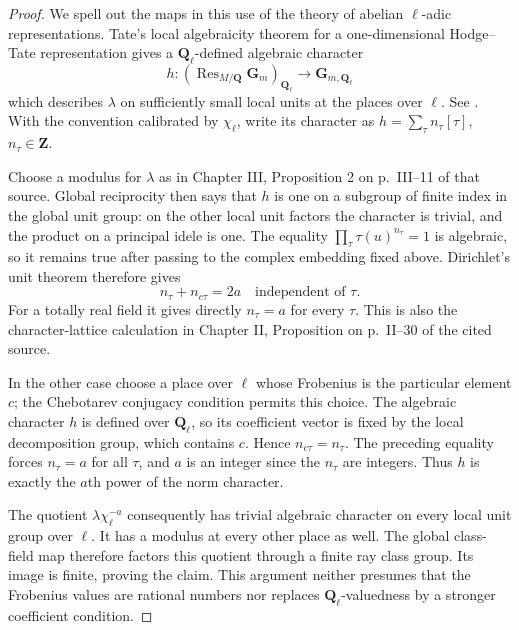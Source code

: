 \begin{proof}
We spell out the maps in this use of the theory of
abelian $\ell$-adic representations. Tate's local
algebraicity theorem for a one-dimensional Hodge--Tate
representation gives a $\mathbf Q_\ell$-defined
algebraic character
\[
 h:(\operatorname{Res}_{M/\mathbf Q}\mathbf G_m)_{\mathbf Q_\ell}
                              \longrightarrow\mathbf G_{m,\mathbf Q_\ell}
\]
which describes $\lambda$ on sufficiently small
local units at the places over $\ell$. See
\cite[Chapter III, Theorem on p.~III--7 and Proposition
on p.~III--9]{A_SerreAbelian}. With the convention
calibrated by $\chi_\ell$, write its character as
$h=\sum_\tau n_\tau[\tau]$, $n_\tau\in\mathbf Z$.

Choose a modulus for $\lambda$ as in Chapter III,
Proposition 2 on p.~III--11 of that source. Global
reciprocity then says that $h$ is one on a subgroup
of finite index in the global unit group: on the
other local unit factors the character is trivial,
and the product on a principal idele is one. The
equality $\prod_\tau\tau(u)^{n_\tau}=1$ is algebraic,
so it remains true after passing to the complex
embedding fixed above. Dirichlet's unit theorem
therefore gives
\[
                  n_\tau+n_{c\tau}=2a
                  \quad\text{independent of }\tau.
\]
For a totally real field it gives directly
$n_\tau=a$ for every $\tau$. This is also the
character-lattice calculation in Chapter II,
Proposition on p.~II--30 of the cited source.

In the other case choose a place over $\ell$ whose
Frobenius is the particular element $c$; the
Chebotarev conjugacy condition permits this choice.
The algebraic character $h$ is defined over
$\mathbf Q_\ell$, so its coefficient vector is fixed
by the local decomposition group, which contains
$c$. Hence $n_{c\tau}=n_\tau$. The preceding equality
forces $n_\tau=a$ for all $\tau$, and $a$ is an
integer since the $n_\tau$ are integers. Thus $h$
is exactly the $a$th power of the norm character.

The quotient $\lambda\chi_\ell^{-a}$ consequently
has trivial algebraic character on every local
unit group over $\ell$. It has a modulus at every
other place as well. The global class-field map
therefore factors this quotient through a finite
ray class group. Its image is finite, proving the
claim. This argument neither presumes that the
Frobenius values are rational numbers nor replaces
$\mathbf Q_\ell$-valuedness by a stronger coefficient
condition.
\end{proof}

